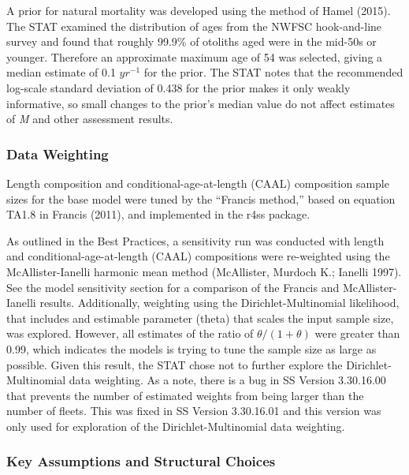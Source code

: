 \documentclass[
  english,
  a4paper,
]{article}
\begin{document}
A prior for natural mortality was developed using the method of Hamel (2015). The STAT examined the distribution of ages from the NWFSC hook-and-line survey and found that roughly 99.9\% of otoliths aged were in the mid-50s or younger. Therefore an approximate maximum age of 54 was selected, giving a median estimate of 0.1 \(yr^{-1}\) for the prior. The STAT notes that the recommended log-scale standard deviation of 0.438 for the prior makes it only weakly informative, so small changes to the prior's median value do not affect estimates of \emph{M} and other assessment results.

\hypertarget{data-weighting}{%
\subsubsection{Data Weighting}\label{data-weighting}}

Length composition and conditional-age-at-length (CAAL) composition sample sizes for
the base model were tuned by the ``Francis method,'' based on equation TA1.8 in Francis
(2011), and implemented in the r4ss package.

As outlined in the Best Practices, a sensitivity run was conducted with length and
conditional-age-at-length (CAAL) compositions were re-weighted using the
McAllister-Ianelli harmonic mean method (McAllister, Murdoch K.; Ianelli 1997). See the model
sensitivity section for a comparison of the Francis and McAllister-Ianelli results.
Additionally, weighting
using the Dirichlet-Multinomial likelihood, that includes and estimable parameter (theta)
that scales the input sample size, was explored. However, all estimates of the ratio of
\(\theta/(1+\theta)\) were greater than 0.99, which indicates the models is trying to tune
the sample size as large as possible. Given this result, the STAT chose not to further explore
the Dirichlet-Multinomial data weighting. As a note, there is a bug in SS Version 3.30.16.00 that
prevents the number of estimated weights from being larger than the number of fleets. This was
fixed in SS Version 3.30.16.01 and this version was only used for exploration of the Dirichlet-Multinomial data weighting.

\hypertarget{key-assumptions-and-structural-choices}{%
\subsubsection{Key Assumptions and Structural Choices}\label{key-assumptions-and-structural-choices}}
\end{document}
